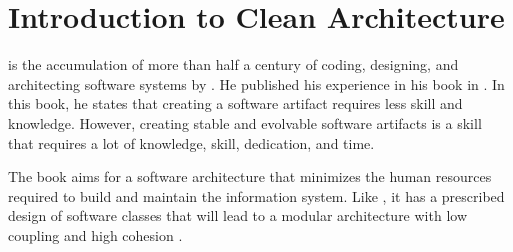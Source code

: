 \section{Introduction to Clean Architecture} \label{sec_into_ca}

\ca is the accumulation of more than half a century of coding, designing, and
architecting software systems by \citeauthor*[]{robert_c_martin_clean_2018}. He published
his experience in his book  in
\citeyear[]{robert_c_martin_clean_2018}. In this book, he states that creating a software
artifact requires less skill and knowledge. However, creating stable and evolvable
software artifacts is a skill that requires a lot of knowledge, skill, dedication, and
time.

The book aims for a software architecture that minimizes the human resources required to
build and maintain the information system. Like \ns, it has a
prescribed design of software classes that will lead to a modular architecture with low
coupling and high cohesion \parencite{robert_c_martin_clean_2018}.
